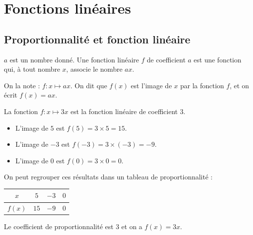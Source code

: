 \documentclass[a4paper,10pt]{report}
\begin{document}
\newpage
\setcounter{chapter}{10}
\chapter{Fonctions linéaires}

\small
\setlength{\parskip}{0pt}
\setlength{\abovedisplayskip}{3pt}
\setlength{\belowdisplayskip}{3pt}

\section{Proportionnalité et fonction linéaire}

\begin{defn}
$a$ est un nombre donné. Une fonction linéaire $f$ de coefficient $a$ est une fonction qui, à tout nombre $x$, associe le nombre $ax$.

\medskip
On la note : $f : x \mapsto ax$. On dit que $f(x)$ est l'image de $x$ par la fonction $f$, et on écrit $f(x)=ax$.
\end{defn}

\begin{ex}
La fonction $f : x \mapsto 3x$ est la fonction linéaire de coefficient $3$.
\begin{itemize}
\item L'image de $5$ est $f(5)=3 \times 5=15$.
\item L'image de $-3$ est $f(-3)=3 \times (-3)=-9$.
\item L'image de $0$ est $f(0)=3 \times 0=0$.
\end{itemize}
\end{ex}

\begin{rem}
On peut regrouper ces résultats dans un tableau de proportionnalité :
\begin{center}
\renewcommand{\arraystretch}{1.3}
\begin{tabular}{|c|c|c|c|}
\hline
$x$ & $5$ & $-3$ & $0$\\
\hline
$f(x)$ & $15$ & $-9$ & $0$\\
\hline
\end{tabular}
\end{center}
Le coefficient de proportionnalité est $3$ et on a $f(x)=3x$.
\end{rem}
\end{document}
